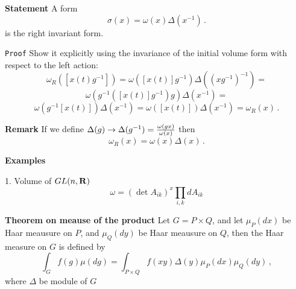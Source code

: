 {\bf Statement}  A form
       $$
\sigma(x)=\omega(x)\Delta(x^{-1})\,.
       $$
  is the right invariant form. 




{\tt Proof}   Show it explicitly using the invariance of the initial
volume form with respect to the left action:
             $$
\omega_R([x(t)g^{-1}])=
\omega([x(t)]g^{-1})\Delta\left(\left(xg^{-1}\right)^{-1}\right)=
         $$
         $$
\omega\left(g^{-1}\left(\left[x(t)\right]
g^{-1}\right)g\right)\Delta(x^{-1})=
           $$
          $$
\omega\left(g^{-1}\left[x(t)\right]
\right)\Delta(x^{-1})=
  \omega \left(\left[x(t)\right]\right)\Delta(x^{-1})=\omega_R(x)\,.
            $$



{\bf Remark}  
If we define $\Delta(g)\to \Delta(g^{-1})=
{\omega (gx)\over \omega (x)}$
then
       $$
\omega_R(x)=\omega(x)\Delta(x)\,.
       $$


{\bf Examples}


1.  Volume of $GL(n,{\bf R})$
                   $$
         \omega=(\det A_{ik})^x \prod_{i,k}dA_{ik}
                    $$
 

{\bf Theorem on meause of the product}
Let  $G=P\times Q$, and let
   $\mu_P(dx)$  be Haar meausure on $P$, 
  and
   $\mu_Q(dy)$  be Haar meausure on $Q$, 
   then the Haar measure  on $G$  is defined by
         $$
    \int_G f(g)\mu(dg)=
      \int_{P\times Q}
      f(xy)\Delta(y)\mu_P(dx)\mu_Q(dy)\,,
         $$     
 where $\Delta$  be module of $G$


\bye
